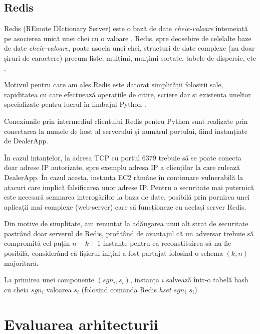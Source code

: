 \documentclass[oneside, 12pt]{book}
\begin{document}
\subsection{Redis}
\label{subsec:redis}

Redis (REmote DIctionary Server) este o bază de date \textit{cheie-valoare} întemeiată pe asocierea unică unei chei cu o valoare \cite{cattell:2011scalable}. Redis, spre deosebire de celelalte baze de date \textit{cheie-valoare}, poate asocia unei chei, structuri de date complexe (nu doar șiruri de caractere) precum liste, mulțimi, mulțimi sortate, tabele de dispersie, etc \cite{website:redis-documentation}.

Motivul pentru care am ales Redis este datorat simplității folosirii sale, rapiditatea cu care efectuează operațiile de citire, scriere dar și existența uneltor specializate pentru lucrul în limbajul Python \cite{website:redis-documentation, website:redis-py}.

Conexiunile prin intermediul clientului Redis pentru Python sunt realizate prin conectarea la numele de host al serverului și numărul portului, fiind instanțiate de DealerApp.

În cazul intanțelor, la adresa TCP cu portul $6379$ trebuie să se poate conecta doar adrese IP autorizate, spre exemplu adresa IP a clienților la care rulează DealerApp. În cazul acesta, instanța EC2 rămâne în continuare vulnerabilă la atacuri care implică falsificarea unor adrese IP. Pentru o securitate mai puternică este necesară semnarea interogărilor la baza de date, posibilă prin pornirea unei aplicații mai complexe (web-server) care să funcționeze cu același server Redis.

Din motive de simplitate, am renunțat la adăugarea unui alt strat de securitate pastrând doar serverul de Redis, profitând de avantajul că un adversar trebuie să compromită cel puțin $n-k+1$ instanțe pentru ca reconstituirea să nu fie posibilă, considerând că fișierul inițial a fost partajat folosind o schema $(k, n)$ majoritară.

La primirea unei componente $(sgn_i, s_i)$, instanța $i$ salvează într-o tabelă hash cu cheia $sgn_i$ valoarea $s_i$ (folosind comanda Redis \textit{hset $sgn_i$ $s_i$}).


\section{Evaluarea arhitecturii}
\end{document}
